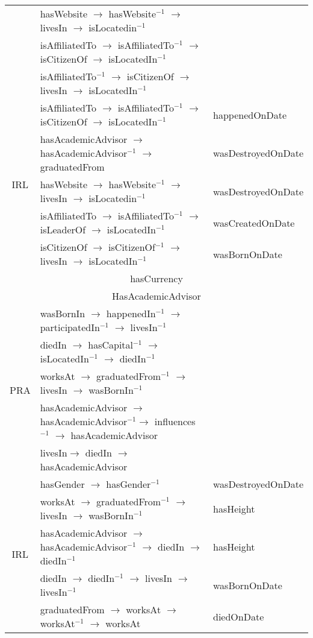 \begin{table}[htbp]
\begin{tabular}{cp{12.6cm}|p{3.4cm}|}
          & hasWebsite $\to$ hasWebsite$^{-1}$ $\to$ livesIn $\to$ isLocatedin$^{-1}$ &  \\
          & isAffiliatedTo $\to$ isAffiliatedTo$^{-1}$ $\to$ isCitizenOf $\to$ isLocatedIn$^{-1}$ &  \\
          & isAffiliatedTo$^{-1}$ $\to$ isCitizenOf $\to$ livesIn $\to$ isLocatedIn$^{-1}$ &  \\
    \midrule
    \multirow{5}[2]{*}{IRL} & isAffiliatedTo $\to$ isAffiliatedTo$^{-1}$ $\to$ isCitizenOf $\to$ isLocatedIn$^{-1}$& happenedOnDate\\
          & hasAcademicAdvisor $\to$ hasAcademicAdvisor$^{-1}$ $\to$ graduatedFrom &wasDestroyedOnDate \\
          & hasWebsite $\to$ hasWebsite$^{-1}$ $\to$ livesIn $\to$ isLocatedin$^{-1}$ & wasDestroyedOnDate\\
          & isAffiliatedTo $\to$ isAffiliatedTo$^{-1}$ $\to$ isLeaderOf $\to$ isLocatedIn$^{-1}$ & wasCreatedOnDate \\
          & isCitizenOf $\to$ isCitizenOf$^{-1}$ $\to$ livesIn $\to$ isLocatedIn$^{-1}$ & wasBornOnDate \\
              \multicolumn{3}{c}{hasCurrency} \\
    \midrule
    \multicolumn{3}{c}{HasAcademicAdvisor} \\
    \midrule
    \multirow{5}[2]{*}{PRA} & wasBornIn $\to$ happenedIn$^{-1}$ $\to$ participatedIn$^{-1}$ $\to$ livesIn$^{-1}$ &  \\
          & diedIn $\to$ hasCapital$^{-1}$ $\to$ isLocatedIn$^{-1}$ $\to$ diedIn$^{-1}$ &  \\
          & worksAt $\to$ graduatedFrom$^{-1}$ $\to$ livesIn $\to$ wasBornIn$^{-1}$ &  \\
          & hasAcademicAdvisor $\to$ hasAcademicAdvisor$^{-1}$$\to$ influences$^{-1}$ $\to$ hasAcademicAdvisor &  \\
          & livesIn$\to$ diedIn $\to$ hasAcademicAdvisor &  \\
    \midrule
    \multirow{5}[2]{*}{IRL} & hasGender $\to$ hasGender$^{-1}$ & wasDestroyedOnDate \\
          & worksAt $\to$ graduatedFrom$^{-1}$ $\to$ livesIn $\to$ wasBornIn$^{-1}$ & hasHeight \\
          & hasAcademicAdvisor $\to$ hasAcademicAdvisor$^{-1}$ $\to$ diedIn $\to$ diedIn$^{-1}$ & hasHeight \\
          & diedIn $\to$ diedIn$^{-1}$ $\to$ livesIn $\to$ livesIn$^{-1}$ & wasBornOnDate \\
          & graduatedFrom $\to$ worksAt $\to$ worksAt$^{-1}$ $\to$ worksAt  & diedOnDate \\
    \midrule
    \bottomrule
    \end{tabular}%
  \label{tab:lit-rel-kbc}%
\end{table}%
